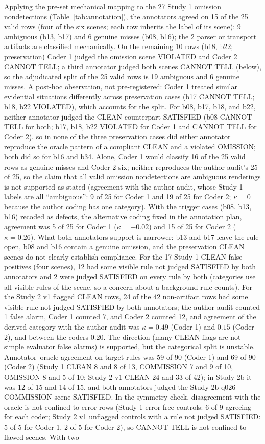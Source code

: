 \documentclass{ieeeaccess}
\begin{document}
Applying the pre-set mechanical mapping to the 27 Study 1 omission nondetections (Table~\ref{tab:annotation}), the annotators agreed on 15 of the 25 valid rows (four of the six scenes; each row inherits the label of its scene): 9 ambiguous (b13, b17) and 6 genuine misses (b08, b16); the 2 parser or transport artifacts are classified mechanically. On the remaining 10 rows (b18, b22; preservation) Coder 1 judged the omission scene VIOLATED and Coder 2 CANNOT TELL; a third annotator judged both scenes CANNOT TELL (below), so the adjudicated split of the 25 valid rows is 19 ambiguous and 6 genuine misses. A post-hoc observation, not pre-registered: Coder 1 treated similar evidential situations differently across preservation cases (b17 CANNOT TELL; b18, b22 VIOLATED), which accounts for the split. For b08, b17, b18, and b22, neither annotator judged the CLEAN counterpart SATISFIED (b08 CANNOT TELL for both; b17, b18, b22 VIOLATED for Coder 1 and CANNOT TELL for Coder 2), so in none of the three preservation cases did either annotator reproduce the oracle pattern of a compliant CLEAN and a violated OMISSION; both did so for b16 and b34. Alone, Coder 1 would classify 16 of the 25 valid rows as genuine misses and Coder 2 six; neither reproduces the author audit's 25 of 25, so the claim that all valid omission nondetections are ambiguous renderings is not supported as stated (agreement with the author audit, whose Study 1 labels are all ``ambiguous'': 9 of 25 for Coder 1 and 19 of 25 for Coder 2; $\kappa=0$ because the author coding has one category). With the trigger cases (b08, b13, b16) recoded as defects, the alternative coding fixed in the annotation plan, agreement was 5 of 25 for Coder 1 ($\kappa=-0.02$) and 15 of 25 for Coder 2 ($\kappa=0.26$). What both annotators support is narrower: b13 and b17 leave the rule open, b08 and b16 contain a genuine omission, and the preservation CLEAN scenes do not clearly establish compliance. For the 17 Study 1 CLEAN false positives (four scenes), 12 had some visible rule not judged SATISFIED by both annotators and 2 were judged SATISFIED on every rule by both (categories use all visible rules of the scene, so a concern about a background rule counts). For the Study 2 v1 flagged CLEAN rows, 24 of the 42 non-artifact rows had some visible rule not judged SATISFIED by both annotators; the author audit counted 1 false alarm, Coder 1 counted 7, and Coder 2 counted 12, and agreement of the derived category with the author audit was $\kappa=0.49$ (Coder 1) and $0.15$ (Coder 2), and between the coders $0.20$. The direction (many CLEAN flags are not simple evaluator false alarms) is supported, but the categorical split is unstable. Annotator--oracle agreement on target rules was 59 of 90 (Coder 1) and 69 of 90 (Coder 2) (Study 1 CLEAN 8 and 8 of 13, COMMISSION 7 and 9 of 10, OMISSION 8 and 5 of 10; Study 2 v1 CLEAN 24 and 33 of 42); in Study 2b it was 12 of 15 and 14 of 15, and both annotators judged the Study 2b q026 COMMISSION scene SATISFIED. In the symmetry check, disagreement with the oracle is not confined to error rows (Study 1 error-free controls: 6 of 9 agreeing for each coder; Study 2 v1 unflagged controls with a rule not judged SATISFIED: 5 of 5 for Coder 1, 2 of 5 for Coder 2), so CANNOT TELL is not confined to flawed scenes. With two 
\end{document}
